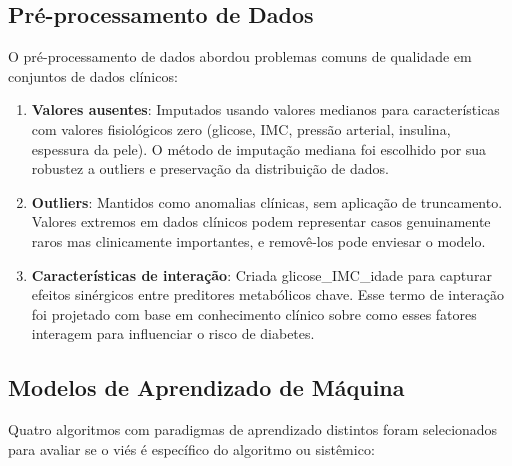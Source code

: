 \subsection{Pré-processamento de Dados}

O pré-processamento de dados abordou problemas comuns de qualidade em 
conjuntos de dados clínicos:

\begin{enumerate}[leftmargin=*]
    \item \textbf{Valores ausentes}: Imputados usando valores medianos para 
          características com valores fisiológicos zero (glicose, IMC, pressão 
          arterial, insulina, espessura da pele). O método de imputação 
          mediana foi escolhido por sua robustez a outliers e preservação 
          da distribuição de dados.
    \item \textbf{Outliers}: Mantidos como anomalias clínicas, sem aplicação 
          de truncamento. Valores extremos em dados clínicos podem representar 
          casos genuinamente raros mas clinicamente importantes, e removê-los 
          pode enviesar o modelo.
    \item \textbf{Características de interação}: Criada glicose\_IMC\_idade 
          para capturar efeitos sinérgicos entre preditores metabólicos chave. 
          Esse termo de interação foi projetado com base em conhecimento 
          clínico sobre como esses fatores interagem para influenciar o 
          risco de diabetes.
\end{enumerate}

\subsection{Modelos de Aprendizado de Máquina}

Quatro algoritmos com paradigmas de aprendizado distintos foram selecionados 
para avaliar se o viés é específico do algoritmo ou sistêmico:


